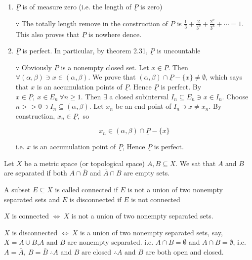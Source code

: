 \begin{enumerate}[wide]
	\item $\underline{P}$ is of measure zero (i.e. the length of $\underline{P}$ is zero)
	
	$\because$ The totally length remove in the construction of $\underline{P}$ is $\frac{1}{3} + \frac{2}{3^2} + \frac{2^2}{3^3}+ \cdots = 1$. This also proves that $\underline{P}$ is nowhere dence.
	
	\item $\underline{P}$ is perfect. In particular, by theorem 2.31, $\underline{P}$ is uncountable
	
	$\because$ Obviously $\underline{P}$ is a nonempty closed set. Let $x \in \underline{P}$. Then $\forall (\alpha , \beta) \ni x \in (\alpha , \beta)$. We prove that $(\alpha , \beta) \cap \underline{P} - \{x\} \neq \emptyset$, which says that $x$ is an accumulation points of $\underline{P}$. Hence $\underline{P}$ is perfect. By $x \in \underline{P},~ x \in E_n ~\forall n \geq 1$. Then $\exists$ a closed subinterval $I_n \subseteq E_n \ni x \in I_n$. Choose $n >> 0 \ni I_n \subseteq (\alpha , \beta)$. Let $x_n$ be an end point of $I_n \ni x \neq x_n$. By construction, $x_n \in \underline{P},$ so 
	
	$$x_n \in (\alpha , \beta) \cap \underline{P} - \{x\}$$
	
	i.e. $x$ is an accumulation point of $\underline{P}$, Hence $\underline{P}$ is perfect.
	
\end{enumerate}

\begin{defn}
	Let $X$ be a metric space (or topological space) $A,B \subseteq X$. We sat that $A$ and $B$ are separated if both $A \cap \overline{B}$ and $\overline{A} \cap B$ are empty sets.
\end{defn}

\begin{defn}
	A subset $E \subseteq X$ is called connected if $E$ is not a union of two nonempty separated sets and $E$ is disconnected if $E$ is not connected
\end{defn}

\begin{rmk*}
	$X$ is connected $\Leftrightarrow ~X$ is not a union of two nonempty separated sets.
	
	$X$ is disconnected $\Leftrightarrow ~ X$ is a union of two nonempty separated sets, say, $X = A \cup B$,$A$ and $B$ are nonempty separated. i.e. $\overline{A} \cap B = \emptyset$ and $A \cap \overline{B} = \emptyset$, i.e. $A = \overline{A},~B = \overline{B}~\therefore A$ and $B$ are closed $\therefore A$ and $B$ are both open and closed.
	
\end{rmk*}



